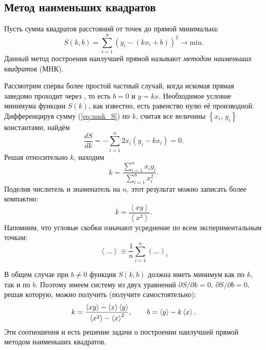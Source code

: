 \subsection{Метод наименьших квадратов}\label{sec:MNK}
\label{sec:linear}
Пусть сумма квадратов расстояний от точек до прямой минимальна:
\begin{equation}\label{eq:mnk_S}
S\!\left(k,b\right)=
\sum\limits _{i=1}^{n}(y_i-(kx_i+b))^{2}\to\mathrm{min}.
\end{equation}
Данный метод построения наилучшей прямой называют \emph{методом наименьших
квадратов} (МНК).

Рассмотрим сперва более простой частный случай, когда искомая прямая
заведомо проходит через , то есть $b=0$ и $y=kx$.
Необходимое условие минимума функции $S\left(k\right)$, как известно,
есть равенство нулю её производной. Дифференцируя сумму (\ref{eq:mnk_S})
по $k$, считая все величины $\left\{ x_{i},\,y_{i}\right\} $ константами,
найдём
\[
\frac{dS}{dk}=-\sum\limits _{i=1}^{n}2x_{i}\left(y_{i}-kx_{i}\right)=0.
\]
Решая относительно $k$, находим
\[
k=\frac{\sum\limits _{i=1}^{n}x_{i}y_{i}}{\sum\limits _{i=1}^{n}x_{i}^{2}}.
\]
Поделив числитель и знаменатель на $n$, этот результат можно записать
более компактно:
\begin{equation}
k=\frac{\left\langle xy\right\rangle }{\left\langle x^{2}\right\rangle}.
\label{eq:MNK0}
\end{equation}
Напомним, что угловые скобки означают усреднение по всем экспериментальным точкам:
\[
\left\langle \ldots\right\rangle \equiv\frac{1}{n}\sum\limits
_{i=1}^{n}\left(\ldots\right)_{i}
\]

В общем случае при $b\ne0$ функция $S\left(k,b\right)$ должна иметь
минимум как по $k$, так и по $b$. Поэтому имеем систему из двух
уравнений $\partial S/\partial k=0$, $\partial S/\partial b=0$,
решая которую, можно получить (получите самостоятельно):
\begin{equation}
    k=\frac{\average{xy}-\average{x}\average{y}}%
        {\average{x^{2}}-\average{x}^2},\qquad
        b=\average{y}-k\average{x}.\label{eq:MNK}
\end{equation}
Эти соотношения и есть решение задачи о построении наилучшей прямой
методом наименьших квадратов.

